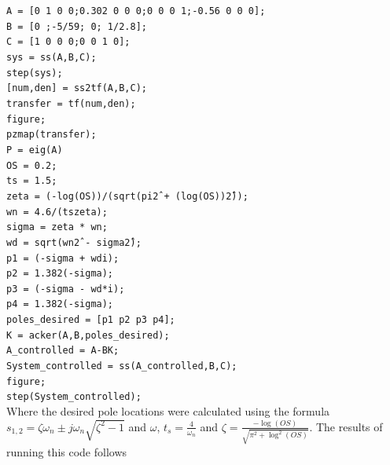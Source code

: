 \documentclass[a4paper, 12pt]{article}
\begin{document}
\noindent
	\texttt{A = [0 1 0 0;0.302 0 0 0;0 0 0 1;-0.56 0 0 0];}\\
	\texttt{B = [0 ;-5/59; 0; 1/2.8];}\\
	\texttt{C = [1 0 0 0;0 0 1 0];}\\
	\texttt{sys = ss(A,B,C);}\\
	\texttt{step(sys);}\\
	\texttt{[num,den] = ss2tf(A,B,C);}\\
	\texttt{transfer = tf(num,den);}\\
	\texttt{figure;}\\
	\texttt{pzmap(transfer);}\\
	\texttt{P = eig(A)}\\
	\texttt{OS = 0.2;}\\
	\texttt{ts = 1.5;}\\
	\texttt{zeta = (-log(OS))/(sqrt(pi\^2 + (log(OS))\^2));}\\
	\texttt{wn = 4.6/(ts\*zeta);}\\
	\texttt{sigma = zeta * wn;}\\
	\texttt{wd = sqrt(wn\^2 - sigma\^2);}\\
	\texttt{p1 = (-sigma + wd\*i);}\\
	\texttt{p2 = 1.382\*(-sigma);}\\
	\texttt{p3 = (-sigma - wd*i);}\\
	\texttt{p4 = 1.382\*(-sigma);}\\
	\texttt{poles\_desired = [p1 p2 p3 p4];}\\
	\texttt{K = acker(A,B,poles\_desired);}\\
	\texttt{A\_controlled = A-B\*K;}\\
	\texttt{System\_controlled = ss(A\_controlled,B,C);}\\
	\texttt{figure;}\\
	\texttt{step(System\_controlled);}\\

\newpage
Where the desired pole locations were calculated using the formula $s_{1,2} =\zeta \omega_n \pm j\omega_n\sqrt{\zeta^2-1}$ and $\omega$, $t_s = \frac{4}{\omega_n}$ and $\zeta = \frac{-\log(OS)}{\sqrt{\pi^2+\log^2(OS)}}$. The results of running this code follows 
\end{document}
